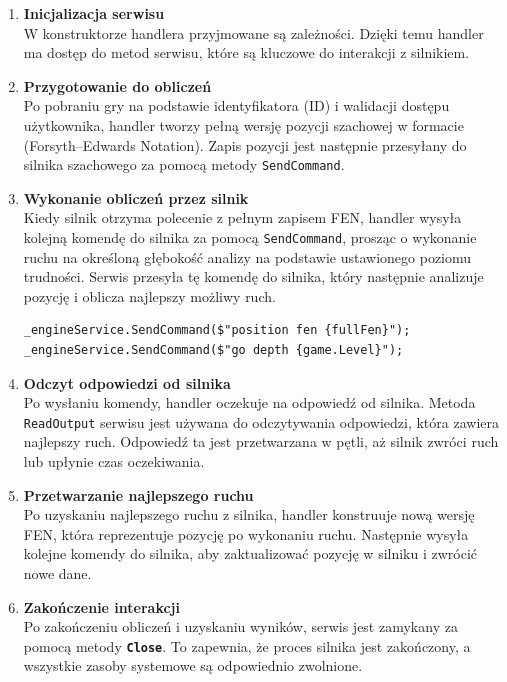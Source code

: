 \documentclass[twoside]{projektInzynierskiMS1}
\begin{document}
\begin{enumerate}
    \item \textbf{Inicjalizacja serwisu}\\
    W konstruktorze handlera przyjmowane są zależności. Dzięki temu handler ma dostęp do metod serwisu, które są kluczowe do interakcji z silnikiem.

    \item \textbf{Przygotowanie do obliczeń}\\
    Po pobraniu gry na podstawie identyfikatora (ID) i walidacji dostępu użytkownika, handler tworzy pełną wersję pozycji szachowej w formacie  (Forsyth–Edwards Notation). Zapis pozycji jest następnie przesyłany do silnika szachowego za pomocą metody \texttt{SendCommand}.

    \item \textbf{Wykonanie obliczeń przez silnik}\\
    Kiedy silnik otrzyma polecenie z pełnym zapisem FEN, handler wysyła kolejną komendę do silnika za pomocą \texttt{SendCommand}, prosząc o wykonanie ruchu na określoną głębokość analizy na podstawie ustawionego poziomu trudności. Serwis przesyła tę komendę do silnika, który następnie analizuje pozycję i oblicza najlepszy możliwy ruch.

\begin{lstlisting}[language=CSharp]
_engineService.SendCommand($"position fen {fullFen}");
_engineService.SendCommand($"go depth {game.Level}");
\end{lstlisting}

    \item \textbf{Odczyt odpowiedzi od silnika}\\
    Po wysłaniu komendy, handler oczekuje na odpowiedź od silnika. Metoda \texttt{ReadOutput} serwisu jest używana do odczytywania odpowiedzi, która zawiera najlepszy ruch. Odpowiedź ta jest przetwarzana w pętli, aż silnik zwróci ruch lub upłynie czas oczekiwania.

    \item \textbf{Przetwarzanie najlepszego ruchu}\\
    Po uzyskaniu najlepszego ruchu z silnika, handler konstruuje nową wersję FEN, która reprezentuje pozycję po wykonaniu ruchu. Następnie wysyła kolejne komendy do silnika, aby zaktualizować pozycję w silniku i zwrócić nowe dane.

    \item \textbf{Zakończenie interakcji}\\
    Po zakończeniu obliczeń i uzyskaniu wyników, serwis jest zamykany za pomocą metody \texttt{\textbf{Close}}. To zapewnia, że proces silnika jest zakończony, a wszystkie zasoby systemowe są odpowiednio zwolnione.
\end{enumerate}
\end{document}
